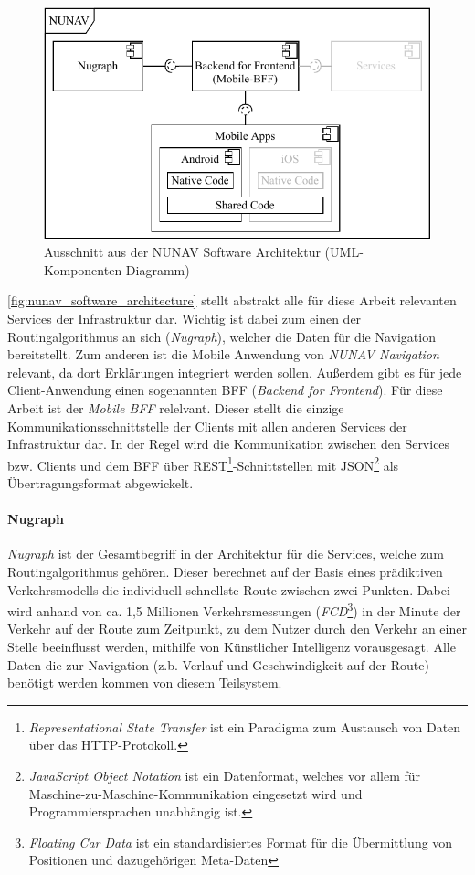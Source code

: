 \begin{figure}[bht!]
    \centering
    \includegraphics[width=\textwidth]{contents/06_model_evaluation/01_integration/res/nunav_architecture.pdf}
    \caption{Ausschnitt aus der NUNAV Software Architektur (UML-Komponenten-Diagramm)}
    \label{fig:nunav_software_architecture}
\end{figure}

\autoref{fig:nunav_software_architecture} stellt abstrakt alle für diese Arbeit relevanten Services der Infrastruktur dar. Wichtig ist dabei zum einen der Routingalgorithmus an sich (\textit{Nugraph}), welcher die Daten für die Navigation bereitstellt. Zum anderen ist die Mobile Anwendung von \textit{NUNAV Navigation} relevant, da dort Erklärungen integriert werden sollen. Außerdem gibt es für jede Client-Anwendung einen sogenannten BFF (\textit{Backend for Frontend}). Für diese Arbeit ist der \textit{Mobile BFF} relelvant. Dieser stellt die einzige Kommunikationsschnittstelle der Clients mit allen anderen Services der Infrastruktur dar. In der Regel wird die Kommunikation zwischen den Services bzw. Clients und dem BFF über REST\footnote{\textit{Representational State Transfer} ist ein Paradigma zum Austausch von Daten über das HTTP-Protokoll.}-Schnittstellen mit JSON\footnote{\textit{JavaScript Object Notation} ist ein Datenformat, welches vor allem für Maschine-zu-Maschine-Kommunikation eingesetzt wird und Programmiersprachen unabhängig ist.} als Übertragungsformat abgewickelt. 

\paragraph{Nugraph} \textit{Nugraph} ist der Gesamtbegriff in der Architektur für die Services, welche zum Routingalgorithmus gehören. Dieser berechnet auf der Basis eines prädiktiven Verkehrsmodells die individuell schnellste Route zwischen zwei Punkten. Dabei wird anhand von ca. 1,5 Millionen Verkehrsmessungen (\textit{FCD}\footnote{\textit{Floating Car Data} ist ein standardisiertes Format für die Übermittlung von Positionen und dazugehörigen Meta-Daten}) in der Minute der Verkehr auf der Route zum Zeitpunkt, zu dem Nutzer durch den Verkehr an einer Stelle beeinflusst werden, mithilfe von Künstlicher Intelligenz vorausgesagt. Alle Daten die zur Navigation (z.b. Verlauf und Geschwindigkeit auf der Route) benötigt werden kommen von diesem Teilsystem.

